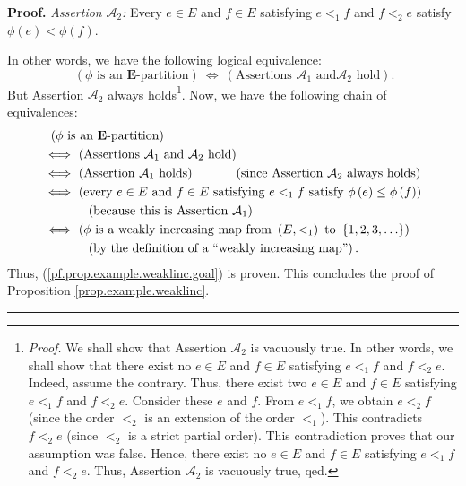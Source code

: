 \documentclass[numbers=enddot,12pt,final,onecolumn,notitlepage,abstracton]{scrartcl}
\theoremstyle{definition}
\newenvironment{proof}[1][Proof]{\noindent\textbf{#1.} }{\ \rule{0.5em}{0.5em}}
\newenvironment{verlong}{}{}
\begin{document}
\begin{verlong}
\begin{footnotesize}
\begin{proof}
\textit{Assertion }$\mathcal{A}_{2}$\textit{:} Every $e\in E$ and $f\in E$
satisfying $e<_{1}f$ and $f<_{2}e$ satisfy $\phi\left(  e\right)  <\phi\left(
f\right)  $.

In other words, we have the following logical equivalence:%
\[
\ \left(  \phi\text{ is an }\mathbf{E}\text{-partition}\right)
\ \Longleftrightarrow\ \left(  \text{Assertions }\mathcal{A}_{1}\text{ and
}\mathcal{A}_{2}\text{ hold}\right)  .
\]
But Assertion $\mathcal{A}_{2}$ always holds\footnote{\textit{Proof.} We shall
show that Assertion $\mathcal{A}_{2}$ is vacuously true. In other words, we
shall show that there exist no $e\in E$ and $f\in E$ satisfying $e<_{1}f$ and
$f<_{2}e$. Indeed, assume the contrary. Thus, there exist two $e\in E$ and
$f\in E$ satisfying $e<_{1}f$ and $f<_{2}e$. Consider these $e$ and $f$. From
$e<_{1}f$, we obtain $e<_{2}f$ (since the order $<_{2}$ is an extension of the
order $<_{1}$). This contradicts $f<_{2}e$ (since $<_{2}$ is a strict partial
order). This contradiction proves that our assumption was false. Hence, there
exist no $e\in E$ and $f\in E$ satisfying $e<_{1}f$ and $f<_{2}e$. Thus,
Assertion $\mathcal{A}_{2}$ is vacuously true, qed.}. Now, we have the
following chain of equivalences:%
\begin{align*}
&  \ \left(  \phi\text{ is an }\mathbf{E}\text{-partition}\right) \\
&  \Longleftrightarrow\ \left(  \text{Assertions }\mathcal{A}_{1}\text{ and
}\mathcal{A}_{2}\text{ hold}\right) \\
&  \Longleftrightarrow\ \left(  \text{Assertion }\mathcal{A}_{1}\text{
holds}\right)  \ \ \ \ \ \ \ \ \ \ \left(  \text{since Assertion }%
\mathcal{A}_{2}\text{ always holds}\right) \\
&  \Longleftrightarrow\ \left(  \text{every }e\in E\text{ and }f\in E\text{
satisfying }e<_{1}f\text{ satisfy }\phi\left(  e\right)  \leq\phi\left(
f\right)  \right) \\
&  \ \ \ \ \ \ \ \ \ \ \left(  \text{because this is Assertion }%
\mathcal{A}_{1}\right) \\
&  \Longleftrightarrow\ \left(  \phi\text{ is a weakly increasing map from
}\left(  E,<_{1}\right)  \text{ to }\left\{  1,2,3,\ldots\right\}  \right) \\
&  \ \ \ \ \ \ \ \ \ \ \left(  \text{by the definition of a \textquotedblleft
weakly increasing map\textquotedblright}\right)  .
\end{align*}
Thus, (\ref{pf.prop.example.weaklinc.goal}) is proven. This concludes the
proof of Proposition \ref{prop.example.weaklinc}.
\end{proof}


\end{footnotesize}
\end{verlong}
\end{document}
